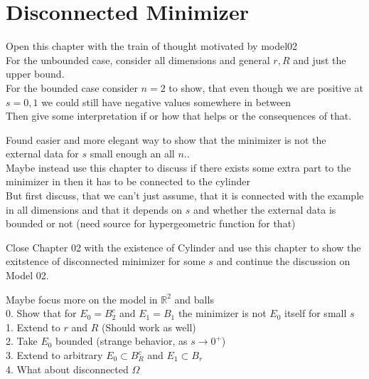 \chapter{Disconnected Minimizer}
\label{ch:disconnected_minimizer}


\begin{IDEA}
  Open this chapter with the train of thought motivated by model02\\ 
  For the unbounded case, consider all dimensions and general \( r,R \) and just the upper
  bound.\\ 
  For the bounded case consider \( n = 2 \) to show, that even though we are positive at
  \( s=0,1 \) we could still have negative values somewhere in between\\ 
  Then give some interpretation if or how that helps or the consequences of that.
\end{IDEA}

\begin{CHECK}
	Found easier and more elegant way to show that the minimizer is not the external data
	for \( s \) small enough an all \( n \)..\\
	Maybe instead use this chapter to discuss if there exists some extra part to the
	minimizer in  then it has to be connected to the cylinder\\
	But first discuss, that we can't just assume, that it is connected with the example in
	all dimensions and that it depends on \( s \) and whether the external data is bounded
	or not (need source for hypergeometric function for that)
\end{CHECK}

\begin{IDEA}
	Close Chapter 02 with the existence of Cylinder and use this chapter to show the
	exitstence of disconnected minimizer for some \( s \) and continue the discussion on
	Model 02.
\end{IDEA}

\begin{TODO}
	Maybe focus more on the model in \( \mathbb{R}^2 \) and balls\\
	0. Show that for \( E_0 = B_2^c \) and \( E_1 = B_1 \) the minimizer is not \( E_0 \)
	itself for small \( s \) \\
	1. Extend to \( r \) and \( R \) (Should work as well)\\
	2. Take \( E_0 \) bounded (strange behavior, as \( s \to 0^ + \))\\
	3. Extend to arbitrary \( E_0 \subset B_R^c \) and \( E_1 \subset B_r \) \\
	4. What about disconnected \( \Omega \)
\end{TODO}


